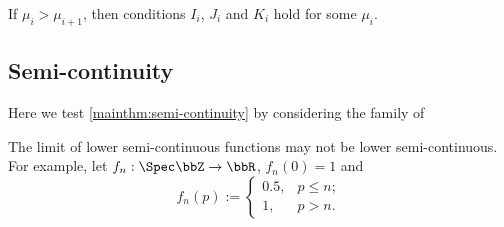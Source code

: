   \begin{proposition}
    If $\mu_i > \mu_{i+1}$, then conditions $I_i$, $J_i$ and $K_i$ hold for some $\mu_i$.
    \Yang{}
  \end{proposition}








\subsection{Semi-continuity}

  Here we test \cref{mainthm:semi-continuity} by considering the family of 

  \begin{remark}
    The limit of lower semi-continuous functions may not be lower semi-continuous.
    For example, let $f_n: \Spec \bbZ \to \bbR$, $f_n(0) = 1$ and
    \[ f_n(p) := \begin{cases}
      0.5, & p \leq n; \\
      1, & p > n.
    \end{cases} \]
  \end{remark}










